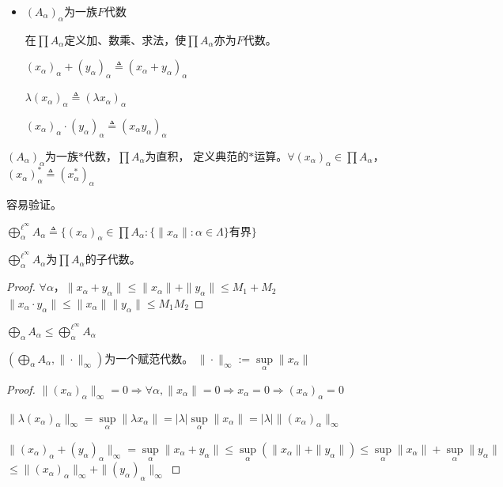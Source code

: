 \documentclass[lang=cn,a4paper,newtx,section]{elegantbook}
\begin{document}
\begin{itemize}
  \item $(A_\alpha)_\alpha$为一族$F$代数
  
  在$\prod A_\alpha$定义加、数乘、求法，使$\prod A_\alpha$亦为$F$代数。
  
  $(x_\alpha)_\alpha + (y_\alpha)_\alpha \triangleq (x_\alpha + y_\alpha)_\alpha$
  
  $\lambda(x_\alpha)_\alpha \triangleq (\lambda x_\alpha)_\alpha$
  
  $(x_\alpha)_\alpha \cdot (y_\alpha)_\alpha \triangleq (x_\alpha y_\alpha)_\alpha$
\end{itemize}

\begin{definition}
  $(A_\alpha)_\alpha$为一族$*$代数，$\prod A_\alpha$为直积，
  定义典范的$*$运算。$\forall (x_\alpha)_\alpha \in \prod A_\alpha$，$(x_\alpha)_\alpha^* \triangleq (x_\alpha^*)_\alpha$
  
  容易验证。
\end{definition}

\begin{definition}
  $\bigoplus\limits_\alpha^{\ell^\infty} A_\alpha \triangleq \{(x_\alpha)_\alpha \in \prod A_\alpha : \{\|x_\alpha\| : \alpha \in \Lambda\} \text{有界}\}$
\end{definition}

\begin{proposition}
  $\bigoplus\limits_\alpha^{\ell^\infty} A_\alpha$为$\prod A_\alpha$的子代数。
\end{proposition}

\begin{proof}
  $\forall \alpha$，$\|x_\alpha + y_\alpha\| \leq \|x_\alpha\| + \|y_\alpha\| \leq M_1 + M_2$
   \quad $\|x_\alpha \cdot y_\alpha\| \leq \|x_\alpha\| \|y_\alpha\| \leq M_1 M_2$
\end{proof}

\begin{remark}
  $\bigoplus\limits_\alpha A_\alpha \leq \bigoplus\limits_\alpha^{\ell^\infty} A_\alpha$
\end{remark}

\begin{definition}
  $(\bigoplus\limits_\alpha A_\alpha, \|\cdot\|_\infty)$为一个赋范代数。
  $\|\cdot\|_\infty := \sup\limits_\alpha \|x_\alpha\|$
\end{definition}

\begin{proof}
  $\|(x_\alpha)_\alpha\|_\infty = 0 \Rightarrow \forall \alpha, \|x_\alpha\| = 0 \Rightarrow x_\alpha = 0 \Rightarrow (x_\alpha)_\alpha = 0$
  
  $\|\lambda(x_\alpha)_\alpha\|_\infty = \sup\limits_\alpha \|\lambda x_\alpha\| = |\lambda| \sup\limits_\alpha \|x_\alpha\| = |\lambda| \|(x_\alpha)_\alpha\|_\infty$
  
  $\|(x_\alpha)_\alpha + (y_\alpha)_\alpha\|_\infty = \sup\limits_\alpha \|x_\alpha + y_\alpha\| \leq \sup\limits_\alpha (\|x_\alpha\| + \|y_\alpha\|) \leq \sup\limits_\alpha \|x_\alpha\| + \sup\limits_\alpha \|y_\alpha\|$
  $\leq \|(x_\alpha)_\alpha\|_\infty + \|(y_\alpha)_\alpha\|_\infty$
\end{proof}
\end{document}
